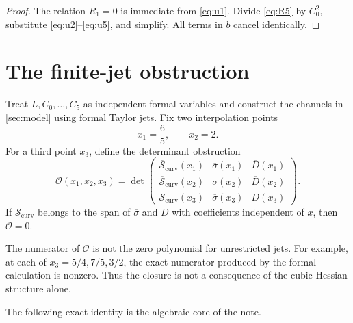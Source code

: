 \documentclass[11pt]{article}
\theoremstyle{definition}
\theoremstyle{remark}
\newcommand{\bsigma}{\overline{\sigma}}
\newcommand{\bD}{\overline{D}}
\newcommand{\bSc}{\overline{\mathcal{S}}_{\mathrm{curv}}}
\begin{document}
\begin{proof}
The relation \(R_1=0\) is immediate from \eqref{eq:u1}. Divide \eqref{eq:R5} by \(C_0^2\), substitute \eqref{eq:u2}--\eqref{eq:u5}, and simplify. All terms in \(b\) cancel identically.
\end{proof}

\section{The finite-jet obstruction}\label{sec:obstruction}

Treat \(L,C_0,\ldots,C_5\) as independent formal variables and construct the channels in \cref{sec:model} using formal Taylor jets. Fix two interpolation points
\begin{equation}\label{eq:interpolationpoints}
 x_1=\frac65,
 \qquad
 x_2=2.
\end{equation}
For a third point \(x_3\), define the determinant obstruction
\begin{equation}\label{eq:Obstruction}
 \mathcal O(x_1,x_2,x_3)
 =\det
 \begin{pmatrix}
 \bSc(x_1)&\bsigma(x_1)&\bD(x_1)\\
 \bSc(x_2)&\bsigma(x_2)&\bD(x_2)\\
 \bSc(x_3)&\bsigma(x_3)&\bD(x_3)
 \end{pmatrix}.
\end{equation}
If \(\bSc\) belongs to the span of \(\bsigma\) and \(\bD\) with coefficients independent of \(x\), then \(\mathcal O=0\).

The numerator of \(\mathcal O\) is not the zero polynomial for unrestricted jets. For example, at each of \(x_3=5/4,7/5,3/2\), the exact numerator produced by the formal calculation is nonzero. Thus the closure is not a consequence of the cubic Hessian structure alone.

The following exact identity is the algebraic core of the note.
\end{document}
